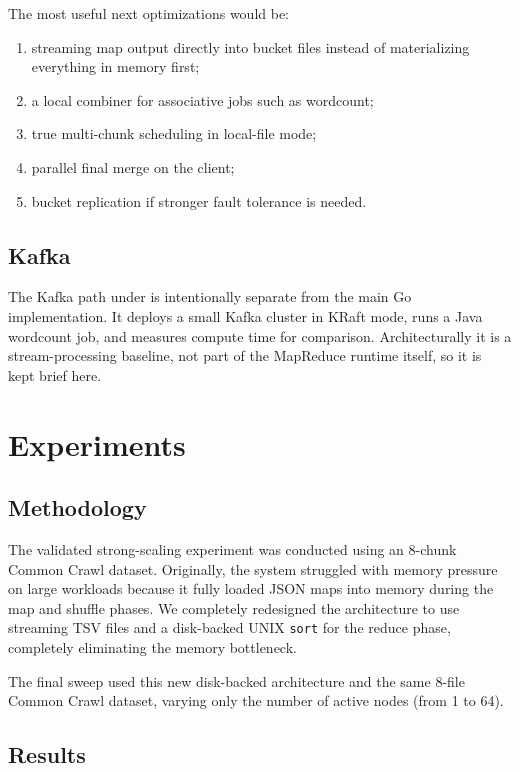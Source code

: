 \documentclass[11pt,a4paper]{article}
\newcommand{\codepath}[1]{\path{#1}}
\begin{document}
The most useful next optimizations would be:
\begin{enumerate}[leftmargin=1.5em]
  \item streaming map output directly into bucket files instead of materializing
  everything in memory first;
  \item a local combiner for associative jobs such as wordcount;
  \item true multi-chunk scheduling in local-file mode;
  \item parallel final merge on the client;
  \item bucket replication if stronger fault tolerance is needed.
\end{enumerate}

\subsection{Kafka}

The Kafka path under \codepath{kafka/*} is intentionally separate from the main
Go implementation. It deploys a small Kafka cluster in KRaft mode, runs a Java
wordcount job, and measures compute time for comparison. Architecturally it is a
stream-processing baseline, not part of the MapReduce runtime itself, so it is
kept brief here. 

\section{Experiments}

\subsection{Methodology}

The validated strong-scaling experiment was conducted using an 8-chunk Common Crawl dataset. Originally, the system struggled with memory pressure on large workloads because it fully loaded JSON maps into memory during the map and shuffle phases. We completely redesigned the architecture to use streaming TSV files and a disk-backed UNIX \texttt{sort} for the reduce phase, completely eliminating the memory bottleneck. 

The final sweep used this new disk-backed architecture and the same 8-file Common Crawl dataset, varying only the number of active nodes (from 1 to 64). 

\subsection{Results}
\end{document}
